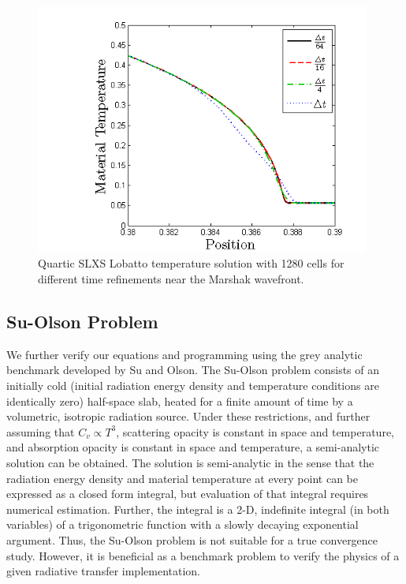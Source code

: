 \begin{figure}[!hbp]
\centering
\includegraphics[width=11cm]{chapter6_grey_radtran/Dissertation_Data/Time_Refinement_Zoom_Temperature.png}
\caption{Quartic SLXS Lobatto temperature solution with 1280 cells for different time refinements near the Marshak wavefront.}
\label{fig:time_refinement_temp}
\end{figure}

\subsection{Su-Olson Problem}

We further verify our equations and programming using the grey analytic benchmark developed by Su and Olson\cite{su_olson_1}.
The Su-Olson problem consists of an initially cold (initial radiation energy density and temperature conditions are identically zero) half-space slab, heated for a finite amount of time by a volumetric, isotropic radiation source.
Under these restrictions, and further assuming that $C_v \propto T^3$, scattering opacity is constant in space and temperature, and absorption opacity is constant in space and temperature, a semi-analytic solution can be obtained.
The solution is semi-analytic in the sense that the radiation energy density and material temperature at every point can be expressed as a closed form integral, but evaluation of that integral requires numerical estimation.
Further, the integral is a 2-D, indefinite integral (in both variables) of a trigonometric function with a slowly  decaying exponential argument.
Thus, the Su-Olson problem is not suitable for a true convergence study.
However, it is beneficial as a benchmark problem to verify the physics of a given radiative transfer implementation.

